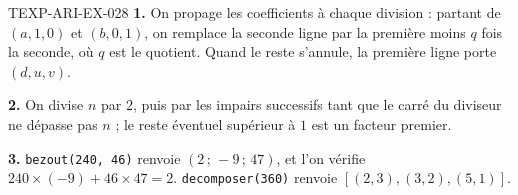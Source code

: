 % 
% 
% 
\begin{corrige}{TEXP-ARI-EX-028}
\textbf{1.} On propage les coefficients à chaque division :
partant de $(a,1,0)$ et $(b,0,1)$, on remplace la seconde ligne par la
première moins $q$ fois la seconde, où $q$ est le quotient. Quand le reste
s'annule, la première ligne porte $(d,u,v)$.

\textbf{2.} On divise $n$ par $2$, puis par les impairs successifs tant que le
carré du diviseur ne dépasse pas $n$ ; le reste éventuel supérieur à $1$ est un
facteur premier.

\textbf{3.} \texttt{bezout(240, 46)} renvoie $(2\,;\,-9\,;\,47)$, et l'on
vérifie $240\times(-9)+46\times47=2$. \texttt{decomposer(360)} renvoie
$[(2,3),(3,2),(5,1)]$.
\end{corrige}
